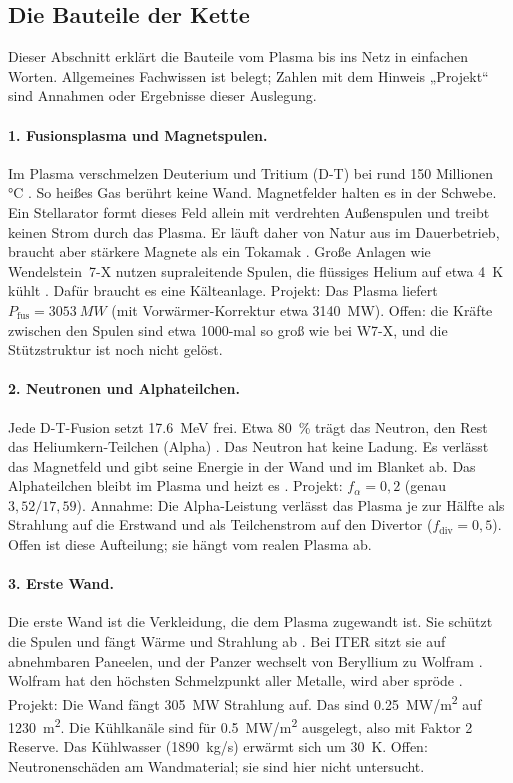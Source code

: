 \subsection{Die Bauteile der Kette}\label{sec:bauteile}
Dieser Abschnitt erklärt die Bauteile vom Plasma bis ins Netz in einfachen Worten. Allgemeines Fachwissen ist belegt; Zahlen mit dem Hinweis „Projekt“ sind Annahmen oder Ergebnisse dieser Auslegung.

\paragraph{1. Fusionsplasma und Magnetspulen.} Im Plasma verschmelzen Deuterium und Tritium (D-T) bei rund 150 Millionen \si{\celsius} \cite{bt_iter_fusion}. So heißes Gas berührt keine Wand. Magnetfelder halten es in der Schwebe. Ein Stellarator formt dieses Feld allein mit verdrehten Außenspulen und treibt keinen Strom durch das Plasma. Er läuft daher von Natur aus im Dauerbetrieb, braucht aber stärkere Magnete als ein Tokamak \cite{bt_stellarator}. Große Anlagen wie Wendelstein~7-X nutzen supraleitende Spulen, die flüssiges Helium auf etwa \SI{4}{K} kühlt \cite{bt_w7x_en}. Dafür braucht es eine Kälteanlage. Projekt: Das Plasma liefert $P_\text{fus} = \SI{3053}{MW}$ (mit Vorwärmer-Korrektur etwa \SI{3140}{MW}). Offen: die Kräfte zwischen den Spulen sind etwa 1000-mal so groß wie bei W7-X, und die Stützstruktur ist noch nicht gelöst.

\paragraph{2. Neutronen und Alphateilchen.} Jede D-T-Fusion setzt \SI{17,6}{MeV} frei. Etwa \SI{80}{\percent} trägt das Neutron, den Rest das Heliumkern-Teilchen (Alpha) \cite{bt_dtfusion,bt_fusionpower}. Das Neutron hat keine Ladung. Es verlässt das Magnetfeld und gibt seine Energie in der Wand und im Blanket ab. Das Alphateilchen bleibt im Plasma und heizt es \cite{bt_tokamak}. Projekt: $f_\alpha = 0{,}2$ (genau $3{,}52/17{,}59$). Annahme: Die Alpha-Leistung verlässt das Plasma je zur Hälfte als Strahlung auf die Erstwand und als Teilchenstrom auf den Divertor ($f_\text{div} = 0{,}5$). Offen ist diese Aufteilung; sie hängt vom realen Plasma ab.

\paragraph{3. Erste Wand.} Die erste Wand ist die Verkleidung, die dem Plasma zugewandt ist. Sie schützt die Spulen und fängt Wärme und Strahlung ab \cite{bt_firstwall}. Bei ITER sitzt sie auf abnehmbaren Paneelen, und der Panzer wechselt von Beryllium zu Wolfram \cite{bt_iter_blanket}. Wolfram hat den höchsten Schmelzpunkt aller Metalle, wird aber spröde \cite{bt_firstwall}. Projekt: Die Wand fängt \SI{305}{MW} Strahlung auf. Das sind \SI{0,25}{MW/m^2} auf \SI{1230}{m^2}. Die Kühlkanäle sind für \SI{0,5}{MW/m^2} ausgelegt, also mit Faktor 2 Reserve. Das Kühlwasser (\SI{1890}{kg/s}) erwärmt sich um \SI{30}{K}. Offen: Neutronenschäden am Wandmaterial; sie sind hier nicht untersucht.

